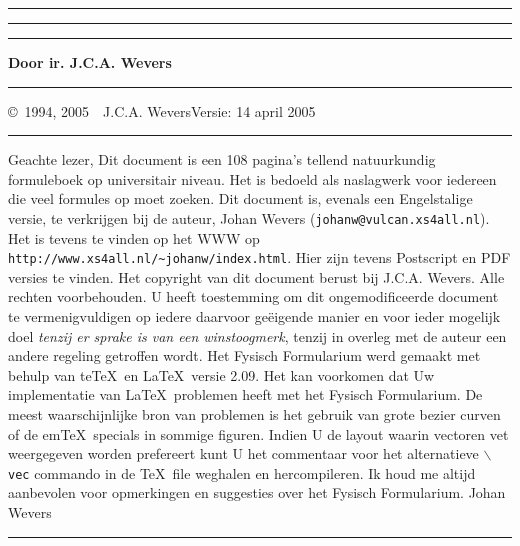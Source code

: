 \thispagestyle{empty}
\setcounter{page}{0}
\hrule
\rule{.4pt}{22.85cm}\hspace*{154mm}\rule{.4pt}{22.85cm}
\vspace*{-18cm}
\begin{center}
\Huge
{}
\end{center}
\vspace{2cm}
\centerline{\Large\bf Door ir. J.C.A. Wevers}
\vspace{2cm}
\vfill
\hrule
\newpage
\thispagestyle{empty}
\copyright~1994, 2005~~J.C.A. Wevers\hfill Versie: 14 april 2005
\npar
\hrule
\par
\bigskip
Geachte lezer,
\npar
Dit document is een 108 pagina's tellend natuurkundig formuleboek op
universitair niveau. Het is bedoeld als naslagwerk voor iedereen die veel
formules op moet zoeken.
\npar
Dit document is, evenals een Engelstalige versie, te verkrijgen bij de
auteur, Johan Wevers\linebreak
({\tt johanw@vulcan.xs4all.nl}).
\npar
Het is tevens te vinden op het WWW op {\tt http://www.xs4all.nl/\~{}johanw/index.html}.
Hier zijn tevens Postscript en PDF versies te vinden.
\npar
Het copyright van dit document berust bij J.C.A. Wevers. Alle rechten
voorbehouden. U heeft toestemming om dit ongemodificeerde document te
vermenigvuldigen op iedere daarvoor ge\"eigende manier en voor ieder mogelijk
doel {\it tenzij er sprake is van een winstoogmerk}, tenzij in overleg met de
auteur een andere regeling getroffen wordt.
\npar
Het Fysisch Formularium werd gemaakt met behulp van te\TeX\ en \LaTeX\ versie 2.09.
\npar
Het kan voorkomen dat Uw implementatie van \LaTeX\ problemen heeft met het
Fysisch Formularium. De meest waarschijnlijke bron van problemen is het
gebruik van grote bezier curven of de em\TeX\ specials in sommige figuren.
Indien U de layout waarin vectoren vet weergegeven worden prefereert kunt U
het commentaar voor het alternatieve {\tt $\backslash$vec} commando in de
\TeX\ file weghalen en hercompileren.
\npar
Ik houd me altijd aanbevolen voor opmerkingen en suggesties over het Fysisch
Formularium.
\npar
Johan Wevers
\vfill
\hrule
\newpage

\tableofcontents
\newpage


